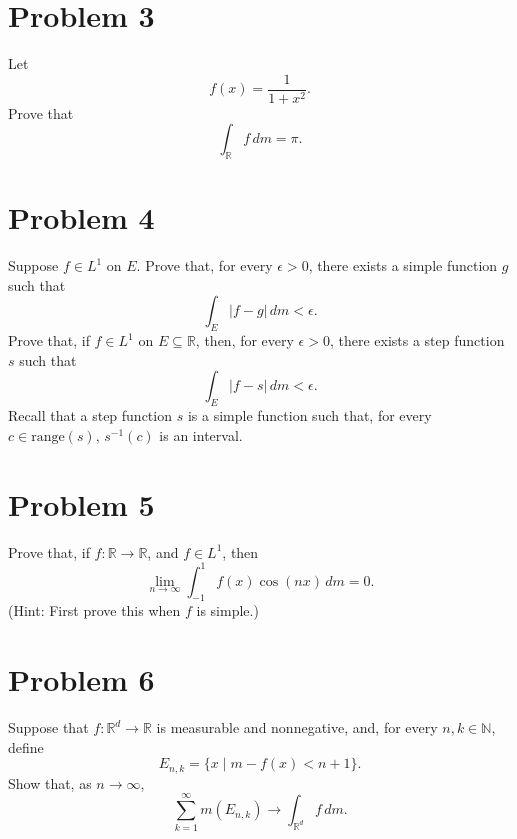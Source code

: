 \documentclass[11pt]{article}
\begin{document}
\newpage

\section*{Problem 3}
Let 
\[
f(x) = \frac{1}{1 + x^2}.
\]
Prove that 
\[
\int_{\mathbb{R}} f \, dm = \pi.
\]

\begin{solution}
    
\end{solution}

\section*{Problem 4}
Suppose \( f \in L^1 \) on \( E \). Prove that, for every \( \epsilon > 0 \), there exists a simple function \( g \) such that 
\[
\int_{E} |f - g| \, dm < \epsilon.
\]
Prove that, if \( f \in L^1 \) on \( E \subseteq \mathbb{R} \), then, for every \( \epsilon > 0 \), there exists a step function \( s \) such that 
\[
\int_{E} |f - s| \, dm < \epsilon.
\]
Recall that a step function \( s \) is a simple function such that, for every \( c \in \text{range}(s) \), \( s^{-1}(c) \) is an interval.

\section*{Problem 5}
Prove that, if \( f: \mathbb{R} \to \mathbb{R} \), and \( f \in L^1 \), then
\[
\lim_{n \to \infty} \int_{-1}^{1} f(x) \cos(nx) \, dm = 0.
\]
(Hint: First prove this when \( f \) is simple.)

\section*{Problem 6}
Suppose that \( f: \mathbb{R}^d \to \mathbb{R} \) is measurable and nonnegative, and, for every \( n, k \in \mathbb{N} \), define
\[
E_{n,k} = \{x \mid m - f(x) < n + 1\}.
\]
Show that, as \( n \to \infty \),
\[
\sum_{k=1}^{\infty} m(E_{n,k}) \to \int_{\mathbb{R}^d} f \, dm.
\]
\end{document}
